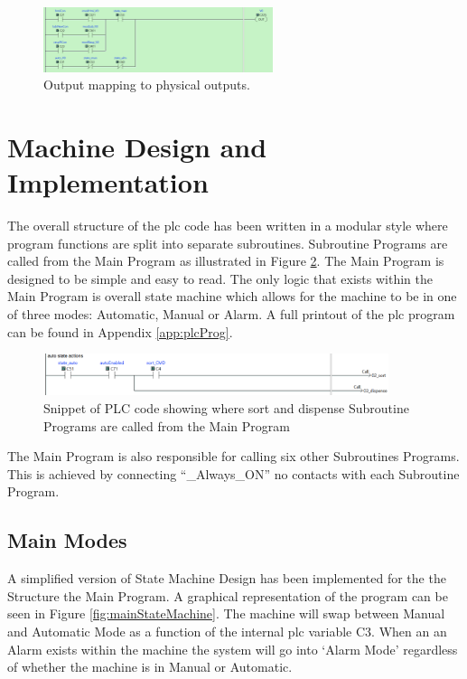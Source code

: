         \begin{figure}[H]
            \centering
            \includegraphics[width = 0.6\textwidth]{2_images/outputMapping}
            \caption{Output mapping to physical outputs.}
            \label{fig:outputMapping}
        \end{figure}        

\section{Machine Design and Implementation}
    The overall structure of the \acrshort{plc} code has been written in a modular style where program functions are split into separate subroutines. Subroutine Programs are called from the Main Program as illustrated in Figure \ref{fig:plcMainAuto}. The Main Program is designed to be simple and easy to read. The only logic that exists within the Main Program is overall state machine which allows for the machine to be in one of three modes: Automatic, Manual or Alarm. A full printout of the \acrshort{plc} program can be found in Appendix \ref{app:plcProg}.

        \begin{figure}[H]
            \centering
            \includegraphics[width = 0.9\textwidth]{2_images/plcMainAuto}
            \caption{Snippet of PLC code showing where sort and dispense Subroutine Programs are called from the Main Program}
            \label{fig:plcMainAuto}
        \end{figure}
    The Main Program is also responsible for calling six other Subroutines Programs. This is achieved by connecting   ``\_Always\_ON'' \acrshort{no} contacts with each Subroutine Program.
    
    \subsection{Main Modes}
    A simplified version of State Machine Design has been implemented for the the Structure the Main Program. A graphical representation of the program can be seen in Figure \ref{fig:mainStateMachine}. The machine will swap between Manual and Automatic Mode as a function of the internal \acrshort{plc} variable C3. When an an Alarm exists within the machine the system will go into `Alarm Mode' regardless of whether the machine is in Manual or Automatic. 
    
